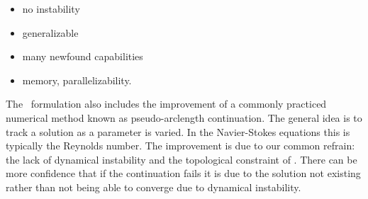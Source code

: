 \begin{description}
{\begin{description}
\begin{itemize}
of an unstable manifold). An arbitrary norm is also chosen in the \spt\
context but there are some subtle differences. For starters, the
norm introduced in the \spt\ formulation is not beholden to dynamics, as
there are no longer any dynamics to speak of.
Additionally, the norm in the \spt\ case measures the distance between \twots,
not just single state space points. This is not a statement of proof but rather
a suggestion that the underlying topology improves the reliability of
the chosen norm. Restated in a different manner, the \spt\ norm
takes both the magnitude and phase into account.
Another numerical advantage is that the \spt\ formulation is able to find solutions
of the \KSe\ starting from modulated random noise. The specifics
of ``modulated random noise'' are described in the numerical methods section
but it can essentially be thought of as randomly assigning values to \spt\
Fourier modes. The ability to find solutions from this starting point
is a radical improvement over the conventional capabilities. This is of course
in conjunction with allowing the \spt\ domain to change. The reaction to these
changes individually has induced skepticism and disbelief; together they comprise
a completely unheard of force.
    \item no instability
    \item generalizable
    \item many newfound capabilities
    \item memory, parallelizability.
    \end{itemize}
\end{description}


The \spt\ formulation also includes the improvement of a commonly
practiced numerical method known as pseudo-arclength continuation.
The general idea is to track a solution as a parameter is varied. In the
Navier-Stokes equations this is typically the Reynolds number.
The improvement is due to our common refrain: the lack of dynamical
instability and the topological constraint of \twots. There can
be more confidence that if the continuation fails it is due to the solution
not existing rather than not being able to converge due to dynamical instability.
}


\end{description}
